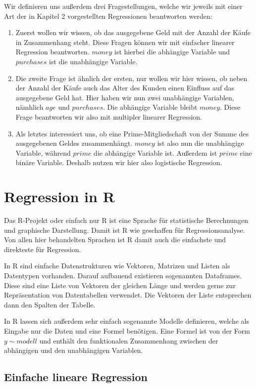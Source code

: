 Wir definieren uns außerdem drei Fragestellungen, welche wir jeweils mit einer Art der in Kapitel 2 vorgestellten Regressionen beantworten werden:
\begin{enumerate}
  \item Zuerst wollen wir wissen, ob das ausgegebene Geld mit der Anzahl der Käufe in Zusammenhang steht. Diese Fragen können wir mit einfacher linearer Regression beantworten. $money$ ist hierbei die abhängige Variable und $purchases$ ist die unabhängige Variable.
  \item Die zweite Frage ist ähnlich der ersten, nur wollen wir hier wissen, ob neben der Anzahl der Käufe auch das Alter des Kunden einen Einfluss auf das ausgegebene Geld hat. Hier haben wir nun zwei unabhängige Variablen, nämhlich $age$ und $purchases$. Die abhängige Variable bleibt $money$. Diese Frage beantworten wir also mit multipler linearer Regression.
  \item Als letztes interessiert uns, ob eine Prime-Mitgliedschaft von der Summe des ausgegebenen Geldes zusammenhängt. $money$ ist also nun die unabhängige Variable, während $prime$ die abhängige Variable ist. Außerdem ist $prime$ eine binäre Variable. Deshalb nutzen wir hier also logistische Regression.
\end{enumerate}


\section{Regression in R}
Das R-Projekt oder einfach nur R ist eine Sprache für statistische Berechnungen und graphische Darstellung. Damit ist R wie geschaffen für Regressionsanalyse. Von allen hier behandelten Sprachen ist R damit auch die einfachste und direkteste für Regression.

In R sind einfache Datenstrukturen wie Vektoren, Matrizen und Listen als Datentypen vorhanden. Darauf aufbauend existieren sogenannten Dataframes. Diese sind eine Liste von Vektoren der gleichen Länge und werden gerne zur Repräsentation von Datentabellen verwendet. Die Vektoren der Liste entsprechen dann den Spalten der Tabelle.

In R lassen sich außerdem sehr einfach sogenannte Modelle definieren, welche als Eingabe nur die Daten und eine Formel benötigen. Eine Formel ist von der Form $y \sim modell$ und enthält den funktionalen Zusammenhang zwischen der abhängigen und den unabhängigen Variablen.

\subsection{Einfache lineare Regression}

